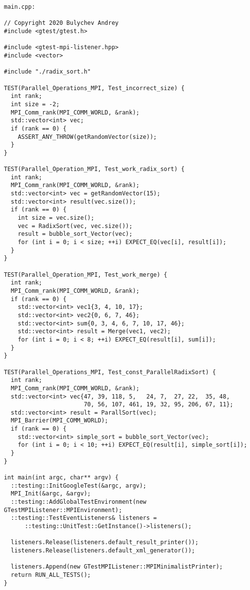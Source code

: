 \documentclass{report}
\begin{document}
\begin{lstlisting}
main.cpp:

// Copyright 2020 Bulychev Andrey
#include <gtest/gtest.h>

#include <gtest-mpi-listener.hpp>
#include <vector>

#include "./radix_sort.h"

TEST(Parallel_Operations_MPI, Test_incorrect_size) {
  int rank;
  int size = -2;
  MPI_Comm_rank(MPI_COMM_WORLD, &rank);
  std::vector<int> vec;
  if (rank == 0) {
    ASSERT_ANY_THROW(getRandomVector(size));
  }
}

TEST(Parallel_Operation_MPI, Test_work_radix_sort) {
  int rank;
  MPI_Comm_rank(MPI_COMM_WORLD, &rank);
  std::vector<int> vec = getRandomVector(15);
  std::vector<int> result(vec.size());
  if (rank == 0) {
    int size = vec.size();
    vec = RadixSort(vec, vec.size());
    result = bubble_sort_Vector(vec);
    for (int i = 0; i < size; ++i) EXPECT_EQ(vec[i], result[i]);
  }
}

TEST(Parallel_Operation_MPI, Test_work_merge) {
  int rank;
  MPI_Comm_rank(MPI_COMM_WORLD, &rank);
  if (rank == 0) {
    std::vector<int> vec1{3, 4, 10, 17};
    std::vector<int> vec2{0, 6, 7, 46};
    std::vector<int> sum{0, 3, 4, 6, 7, 10, 17, 46};
    std::vector<int> result = Merge(vec1, vec2);
    for (int i = 0; i < 8; ++i) EXPECT_EQ(result[i], sum[i]);
  }
}

TEST(Parallel_Operations_MPI, Test_const_ParallelRadixSort) {
  int rank;
  MPI_Comm_rank(MPI_COMM_WORLD, &rank);
  std::vector<int> vec{47, 39, 118, 5,   24, 7,  27, 22,  35, 48,
                       70, 56, 107, 461, 19, 32, 95, 206, 67, 11};
  std::vector<int> result = ParallSort(vec);
  MPI_Barrier(MPI_COMM_WORLD);
  if (rank == 0) {
    std::vector<int> simple_sort = bubble_sort_Vector(vec);
    for (int i = 0; i < 10; ++i) EXPECT_EQ(result[i], simple_sort[i]);
  }
}

int main(int argc, char** argv) {
  ::testing::InitGoogleTest(&argc, argv);
  MPI_Init(&argc, &argv);
  ::testing::AddGlobalTestEnvironment(new GTestMPIListener::MPIEnvironment);
  ::testing::TestEventListeners& listeners =
      ::testing::UnitTest::GetInstance()->listeners();

  listeners.Release(listeners.default_result_printer());
  listeners.Release(listeners.default_xml_generator());

  listeners.Append(new GTestMPIListener::MPIMinimalistPrinter);
  return RUN_ALL_TESTS();
}

\end{lstlisting}
    
\end{document}
